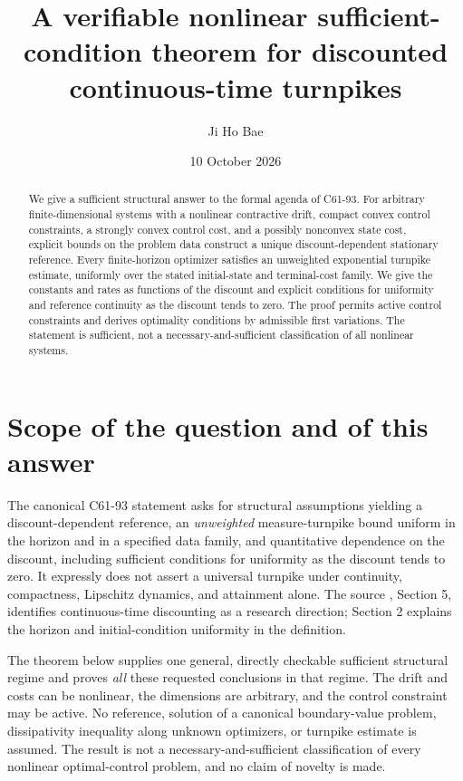 \documentclass[11pt,a4paper]{article}
\title{A verifiable nonlinear sufficient-condition theorem for discounted continuous-time turnpikes}
\author{Ji Ho Bae}
\date{10 October 2026}
\begin{document}
\maketitle

\begin{abstract}
We give a sufficient structural answer to the formal agenda of C61-93.
For arbitrary finite-dimensional systems with a nonlinear contractive drift,
compact convex control constraints, a strongly convex control cost, and a
possibly nonconvex state cost, explicit bounds on the problem data construct
a unique discount-dependent stationary reference. Every finite-horizon
optimizer satisfies an unweighted exponential turnpike estimate, uniformly
over the stated initial-state and terminal-cost family. We give the
constants and rates as functions of the discount and explicit conditions
for uniformity and reference continuity as the discount tends to zero.
The proof permits active control constraints and derives optimality
conditions by admissible first variations. The statement is sufficient,
not a necessary-and-sufficient classification of all nonlinear systems.
\end{abstract}

\section{Scope of the question and of this answer}
The canonical C61-93 statement asks for structural assumptions yielding a
discount-dependent reference, an \emph{unweighted} measure-turnpike bound
uniform in the horizon and in a specified data family, and quantitative
dependence on the discount, including sufficient conditions for uniformity
as the discount tends to zero. It expressly does not assert a universal
turnpike under continuity, compactness, Lipschitz dynamics, and attainment
alone. The source \cite{overview}, Section 5, identifies continuous-time
discounting as a research direction; Section 2 explains the horizon and
initial-condition uniformity in the definition.

The theorem below supplies one general, directly checkable sufficient
structural regime and proves \emph{all} these requested conclusions in that
regime. The drift and costs can be nonlinear, the dimensions are arbitrary,
and the control constraint may be active. No reference, solution of a
canonical boundary-value problem, dissipativity inequality along unknown
optimizers, or turnpike estimate is assumed. The result is not a
necessary-and-sufficient classification of every nonlinear optimal-control
problem, and no claim of novelty is made.
\end{document}

